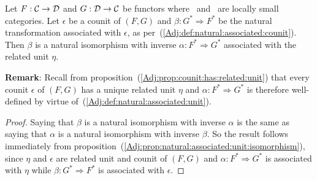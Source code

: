 \begin{prop}\label{Adj:prop:natural:associated:counit:isomorphism}
    Let $F:\mbox{$\cal C$}\to\mbox{$\cal D$}$ and $G:\mbox{$\cal D$}\to\mbox{$\cal C$}$ be functors where \Cat\ and \Dat\ 
    are locally small categories. Let $\epsilon$ be a counit of $(F,G)$ and 
    $\beta:G^{*}\Rightarrow F^{*}$ be the natural transformation associated
    with $\epsilon$, as per~(\ref{Adj:def:natural:associated:counit}). Then 
    $\beta$ is a natural isomorphism with inverse $\alpha:F^{*}\Rightarrow G^{*}$ 
    associated with the related unit $\eta$.
\end{prop}
\noindent
{\bf Remark}: Recall from proposition~(\ref{Adj:prop:counit:has:related:unit})
that every counit $\epsilon$ of $(F,G)$ has a unique related unit $\eta$ and
$\alpha:F^{*}\Rightarrow G^{*}$ is therefore well-defined by virtue 
of~(\ref{Adj:def:natural:associated:unit}).

\noindent
\begin{proof}
    Saying that $\beta$ is a natural isomorphism with inverse $\alpha$ is the
    same as saying that $\alpha$ is a natural isomorphism with inverse $\beta$.
    So the result follows immediately from 
    proposition~(\ref{Adj:prop:natural:associated:unit:isomorphism}),
    since $\eta$ and $\epsilon$ are related unit and counit of $(F,G)$ and
    $\alpha:F^{*}\Rightarrow G^{*}$ is associated with $\eta$ while
    $\beta:G^{*}\Rightarrow F^{*}$ is associated with $\epsilon$.
\end{proof}

